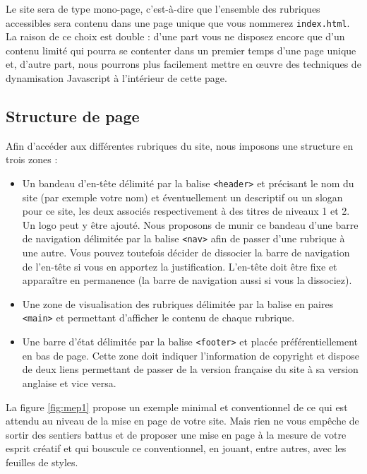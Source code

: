 \documentclass[a4paper,12pt]{article}
\newcommand\Code[1]{\textcolor{couleur_code}{\texttt{#1}}}
\begin{document}
Le site sera de type mono-page, c'est-à-dire que l'ensemble des rubriques 
accessibles sera contenu dans une page unique que vous nommerez \Code{index.html}. 
La raison de ce choix est double : d'une part vous ne disposez encore que d'un 
contenu limité qui pourra se contenter dans un premier temps d'une page unique 
et, d'autre part, nous pourrons plus facilement mettre en \oe uvre des 
techniques de dynamisation Javascript à l'intérieur de cette page.

\subsection{Structure de page}
Afin d'accéder aux différentes rubriques du site, nous imposons une structure 
en trois zones :

\begin{itemize}
  \item Un bandeau d'en-tête délimité par la balise \Code{<header>} et 
        précisant le nom du site (par exemple votre nom) et éventuellement
        un descriptif ou un slogan pour ce site, les deux associés 
        respectivement à des titres de niveaux 1 et 2. Un logo peut y être 
        ajouté. 
        Nous proposons de munir ce bandeau d'une barre de navigation délimitée
        par la balise \texttt{<nav>} afin de passer d'une rubrique à une autre. 
        Vous pouvez toutefois décider de dissocier la barre de navigation de 
        l'en-tête si vous en apportez la justification. 
        L'en-tête doit être fixe et apparaître en permanence (la barre de
        navigation aussi si vous la dissociez).  
  \item Une zone de visualisation des rubriques délimitée par la balise en
        paires \Code{<main>} et permettant d'afficher le contenu de chaque 
        rubrique. 
  \item Une barre d'état délimitée par la balise \Code{<footer>} 
        et placée préférentiellement en bas de page. Cette zone doit indiquer 
        l'information de copyright et dispose de deux liens permettant de 
        passer de la version française du site à sa version anglaise et vice 
        versa.      
\end{itemize}
\vspace{10pt}

La figure \ref{fig:mep1} propose un exemple minimal et conventionnel de ce 
qui est attendu au niveau de la mise en page de votre site. Mais rien ne 
vous empêche de sortir des sentiers battus et de proposer une mise en page
à la mesure de votre esprit créatif et qui bouscule ce conventionnel, en 
jouant, entre autres, avec les feuilles de styles. 
\end{document}
